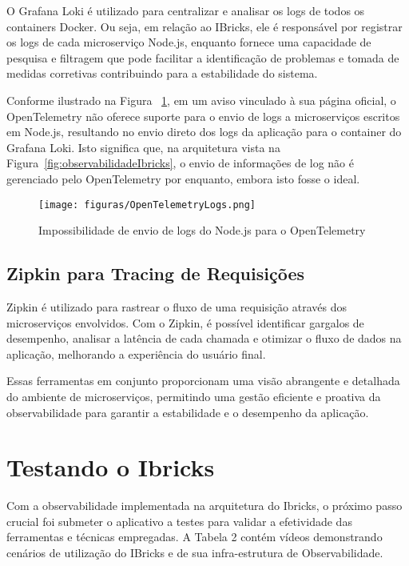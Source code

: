 \documentclass[12pt]{article}
\begin{document}
O Grafana Loki é utilizado para centralizar e analisar os logs de todos os containers Docker. Ou seja, em relação ao IBricks, ele é responsável por registrar os logs de cada microserviço Node.js, enquanto fornece uma capacidade de pesquisa e filtragem que pode facilitar a identificação de problemas e tomada de medidas corretivas contribuindo para a estabilidade do sistema.

Conforme ilustrado na Figura ~\ref{fig:openTelemetryLogs}, em um aviso vinculado à sua página oficial, o OpenTelemetry não oferece suporte para o envio de logs a microserviços escritos em Node.js, resultando no envio direto dos logs da aplicação para o container do Grafana Loki. Isto significa que, na arquitetura vista na Figura~\ref{fig:observabilidadeIbricks}, o envio de informações de log não é gerenciado pelo OpenTelemetry por enquanto, embora isto fosse o ideal.

\begin{figure}[!htb]
\centering
\texttt{[image: figuras/OpenTelemetryLogs.png]}
\caption{Impossibilidade de envio de logs do Node.js para o OpenTelemetry}
\label{fig:openTelemetryLogs}
\end{figure}

\subsection{Zipkin para Tracing de Requisições}

Zipkin é utilizado para rastrear o fluxo de uma requisição através dos microserviços envolvidos. Com o Zipkin, é possível identificar gargalos de desempenho, analisar a latência de cada chamada e otimizar o fluxo de dados na aplicação, melhorando a experiência do usuário final.

Essas ferramentas em conjunto proporcionam uma visão abrangente e detalhada do ambiente de microserviços, permitindo uma gestão eficiente e proativa da observabilidade para garantir a estabilidade e o desempenho da aplicação.

\section{Testando o Ibricks}

Com a observabilidade implementada na arquitetura do Ibricks, o próximo passo crucial foi submeter o aplicativo a testes para validar a efetividade das ferramentas e técnicas empregadas. A Tabela 2 contém vídeos demonstrando cenários de utilização do IBricks e de sua infra-estrutura de Observabilidade.
\end{document}
